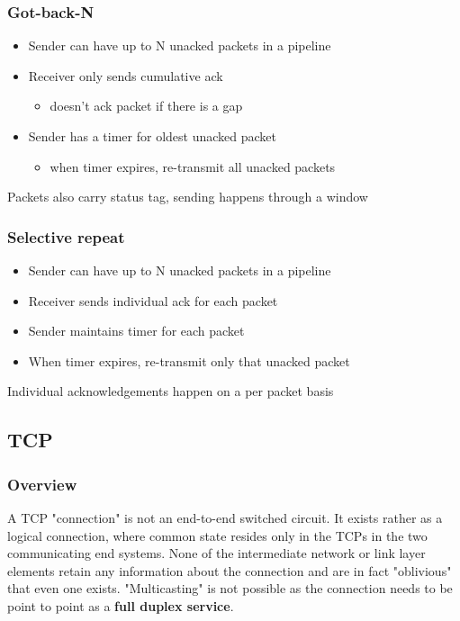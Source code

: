 \documentclass[11pt]{article}
\begin{document}
\subsubsection{Got-back-N}
\label{sec:org1f01267}
\begin{itemize}
\item Sender can have up to N unacked packets in a pipeline
\item Receiver only sends cumulative ack
\begin{itemize}
\item doesn't ack packet if there is a gap
\end{itemize}
\item Sender has a timer for oldest unacked packet
\begin{itemize}
\item when timer expires, re-transmit all unacked packets
\end{itemize}
\end{itemize}

Packets also carry status tag, sending happens through a window

\subsubsection{Selective repeat}
\label{sec:orgbbc4ec4}
\begin{itemize}
\item Sender can have up to N unacked packets in a pipeline
\item Receiver sends individual ack for each packet
\item Sender maintains timer for each packet
\item When timer expires, re-transmit only that unacked packet
\end{itemize}


Individual acknowledgements happen on a per packet basis

\subsection{TCP}
\label{sec:org10f80b6}
\subsubsection{Overview}
\label{sec:org49bf41f}

A TCP "connection" is not an end-to-end switched circuit. It exists
rather as a logical connection, where common state resides only in the
TCPs in the two communicating end systems. None of the intermediate
network or link layer elements retain any information about the
connection and are in fact "oblivious" that even one exists.
"Multicasting" is not possible as the connection needs to be point to
point as a \textbf{full duplex service}.
\end{document}
